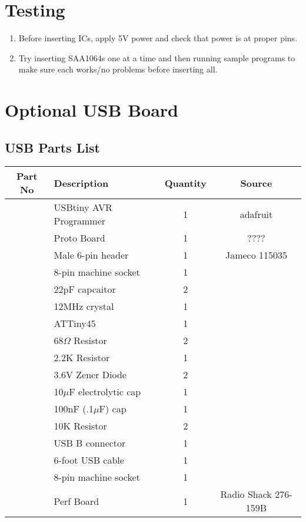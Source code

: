\documentclass[11pt]{article}
\begin{document}
\section{Testing}
\begin{enumerate}
\item Before inserting ICs, apply 5V power and check that power is
      at proper pins.
\item Try inserting SAA1064s one at a time and then running sample
      programs to make sure each works/no problems before inserting all.
\end{enumerate}

\pagebreak




\section{Optional USB Board}


\subsection{USB Parts List}

\begin{tabular}{|c|l|c|c|}
\hline
Part No   &  Description    &  Quantity    &   Source \\
\hline
\hline
          &  USBtiny AVR Programmer  & 1  & adafruit\\ %
\hline
\hline
          &  Proto Board             & 1  & ????    \\ %
          &  Male 6-pin header       & 1  & Jameco 115035 \\ %
          &  8-pin machine socket    & 1  & \\
\hline
\hline
          &  22pF capcaitor          & 2  & \\
          &  12MHz crystal           & 1  & \\
          &  ATTiny45                & 1  & \\
          &  68$\Omega$ Resistor          & 2  & \\
          &  2.2K Resistor           & 1  & \\
          &  3.6V Zener Diode        & 2  & \\
          &  10$\mu$F electrolytic cap   & 1  & \\
          &  100nF (.1$\mu$F) cap        & 1  & \\
          &  10K Resistor            & 2  & \\
          &  USB B connector         & 1  & \\
          &  6-foot USB cable        & 1  & \\
          &  8-pin machine socket    & 1  & \\
          &  Perf Board              & 1  & Radio Shack 276-159B \\
\hline

\hline
\end{tabular}
\end{document}
